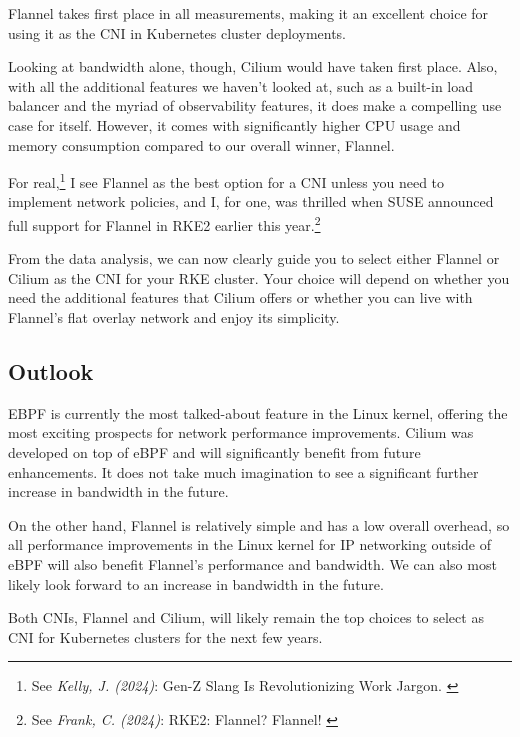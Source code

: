 Flannel takes first place in all measurements, making it an excellent choice for using it as the CNI in Kubernetes cluster deployments.

Looking at bandwidth alone, though, Cilium would have taken first place. Also, with all the additional features we haven't looked at, such as a built-in load balancer and the myriad of observability features, it does make a compelling use case for itself. However, it comes with significantly higher CPU usage and memory consumption compared to our overall winner, Flannel.

For real,\footnote{See \textit{Kelly, J. (2024)}: Gen-Z Slang Is Revolutionizing Work Jargon. \cite{genzSlang}} I see Flannel as the best option for a CNI unless you need to implement network policies, and I, for one, was thrilled when SUSE announced full support for Flannel in RKE2 earlier this year.\footnote{See \textit{Frank, C. (2024)}: RKE2: Flannel? Flannel! \cite{rke2Flannel}}

From the data analysis, we can now clearly guide you to select either Flannel or Cilium as the CNI for your RKE cluster. Your choice will depend on whether you need the additional features that Cilium offers or whether you can live with Flannel's flat overlay network and enjoy its simplicity.

\subsection{Outlook}

EBPF is currently the most talked-about feature in the Linux kernel, offering the most exciting prospects for network performance improvements. Cilium was developed on top of eBPF and will significantly benefit from future enhancements. It does not take much imagination to see a significant further increase in bandwidth in the future.

On the other hand, Flannel is relatively simple and has a low overall overhead, so all performance improvements in the Linux kernel for IP networking outside of eBPF will also benefit Flannel's performance and bandwidth. We can also most likely look forward to an increase in bandwidth in the future.

Both CNIs, Flannel and Cilium, will likely remain the top choices to select as CNI for Kubernetes clusters for the next few years.
